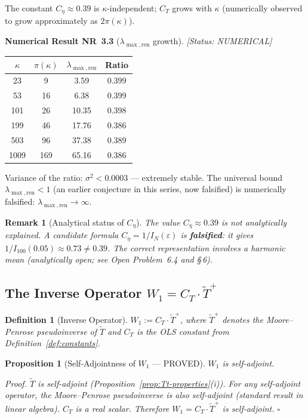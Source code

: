 \documentclass[11pt]{article}
\newtheorem{proposition}[theorem]{Proposition}
\newtheorem{definition}[theorem]{Definition}
\newtheorem*{remark}{Remark}
\newcommand{\Tt}{\widetilde{T}}
\newcommand{\Ceta}{C_{\eta}}
\newcommand{\CT}{C_{T}}
\newcommand{\Wone}{W_1}
\begin{document}
The constant $\Ceta\approx 0.39$ is $\kappa$-independent;
$\CT$ grows with $\kappa$ (numerically observed to grow approximately as $2\pi(\kappa)$).

\textbf{Numerical Result NR~3.3} ($\lambda_{\max,\mathrm{ren}}$ growth).
\emph{[Status: NUMERICAL]}

\begin{center}
\begin{tabular}{cccc}
\toprule
$\kappa$ & $\pi(\kappa)$ & $\lambda_{\max,\mathrm{ren}}$ & Ratio \\
\midrule
23  & 9   & 3.59  & 0.399 \\
53  & 16  & 6.38  & 0.399 \\
101 & 26  & 10.35 & 0.398 \\
199 & 46  & 17.76 & 0.386 \\
503 & 96  & 37.38 & 0.389 \\
1009 & 169 & 65.16 & 0.386 \\
\bottomrule
\end{tabular}
\end{center}

Variance of the ratio: $\sigma^2 < 0.0003$ --- extremely stable.
The universal bound $\lambda_{\max,\mathrm{ren}} < 1$
(an earlier conjecture in this series, now falsified) is numerically falsified:
$\lambda_{\max,\mathrm{ren}}\to\infty$.

\begin{remark}[Analytical status of $\Ceta$]
The value $\Ceta\approx 0.39$ is not analytically explained.
A candidate formula $\Ceta = 1/I_N(\varepsilon)$ is \textbf{falsified}:
it gives $1/I_{100}(0.05)\approx 0.73\neq 0.39$.
The correct representation involves a harmonic mean
(analytically open; see Open Problem~6.4 and \S\,6).
\end{remark}

\subsection{The Inverse Operator $\Wone = \CT\cdot\Tt^+$}

\begin{definition}[Inverse Operator]
$\Wone := \CT\cdot\Tt^+$,
where $\Tt^+$ denotes the Moore--Penrose pseudoinverse of $\Tt$
and $\CT$ is the OLS constant from Definition~\ref{def:constants}.
\end{definition}

\begin{proposition}[Self-Adjointness of $\Wone$ --- PROVED]\label{prop:W1-sa}
$\Wone$ is self-adjoint.

\emph{Proof.}
$\Tt$ is self-adjoint (Proposition~\ref{prop:Tt-properties}(i)).
For any self-adjoint operator, the Moore--Penrose pseudoinverse is also
self-adjoint (standard result in linear algebra).
$\CT$ is a real scalar.
Therefore $\Wone = \CT\cdot\Tt^+$ is self-adjoint. $\square$
\end{proposition}
\end{document}

